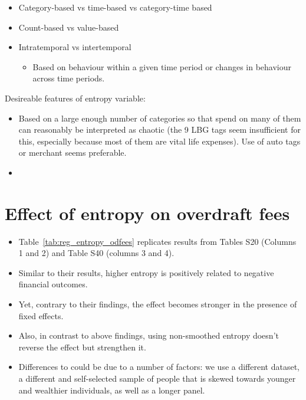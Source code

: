 \begin{itemize}
    \item Category-based vs time-based vs category-time based
        \citep{guidotti2015behavioral, krumme2013predictability}

    \item Count-based vs value-based

    \item Intratemporal vs intertemporal \citep{krumme2013predictability}

        \begin{itemize}
            \item Based on behaviour within a given time period or changes in
                behaviour across time periods.
        \end{itemize}
        
\end{itemize}

Desireable features of entropy variable:

\begin{itemize}
    \item Based on a large enough number of categories so that spend on many of
        them can reasonably be interpreted as chaotic (the 9 LBG tags seem
        insufficient for this, especially because most of them are vital life
        expenses). Use of auto tags or merchant seems preferable.

    \item 
\end{itemize}


\section{Effect of entropy on overdraft fees}%
\label{sub:effect_of_entropy_on_overdraft_fees}

\begin{itemize}

    \item Table~\ref{tab:reg_entropy_odfees} replicates results from
        \citet{muggleton2020evidence} Tables S20 (Columns 1 and 2) and Table
        S40 (columns 3 and 4).

    \item Similar to their results, higher entropy is positively related to
        negative financial outcomes.

    \item Yet, contrary to their findings, the effect becomes stronger in the
        presence of fixed effects.

    \item Also, in contrast to above findings, using non-smoothed entropy
        doesn't reverse the effect but strengthen it.

    \item Differences to \citet{muggleton2020evidence} could be due to a number
        of factors: we use a different dataset, a different and self-selected sample of people
        that is skewed towards younger and wealthier individuals, as well as a
        longer panel.

\end{itemize}

